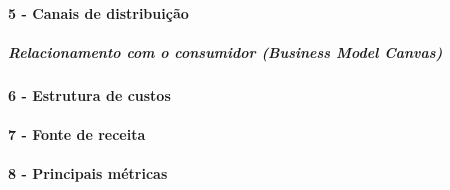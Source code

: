 \documentclass[12pt,a4paper,twoside,hyphens,english,brazil]{abntex2}
\begin{document}
\paragraph*{5 - Canais de distribuição}
%
%

\subparagraph*{Relacionamento com o consumidor \emph{(Business Model Canvas)}}

\paragraph*{6 - Estrutura de custos}

\paragraph*{7 - Fonte de receita}

\paragraph*{8 - Principais métricas}
\end{document}
